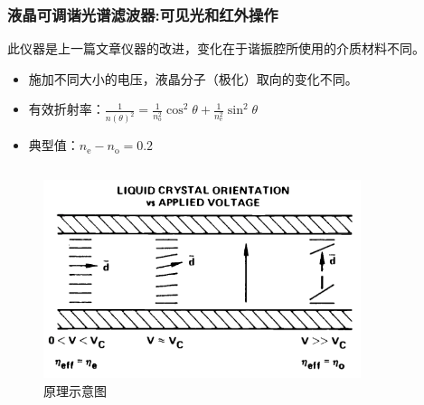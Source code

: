 \begin{frame}[c]
    \frametitle{液晶可调谐光谱滤波器:可见光和红外操作}
    此仪器是上一篇文章仪器的改进，变化在于谐振腔所使用的介质材料不同。
    \begin{itemize}
        \item 施加不同大小的电压，液晶分子（极化）取向的变化不同。
        \item 有效折射率：$\frac{1}{n(\theta)^2}=\frac{1}{n_\mathrm{o}^2}\cos^2\theta+\frac{1}{n_\mathrm{e}^2}\sin^2\theta$
        \item 典型值：$n_{\mathrm{e}}-n_{\mathrm{o}}=0.2$
    \end{itemize}

    \begin{columns}
        \begin{column}{.5\textwidth}
            \begin{figure}[!htb] %
                \centering %
                \includegraphics[width=1.\textwidth]{figures/A Liquid Crystal Tunable Spectral Filter Visible And Infrared Operation_2.png} %
                \caption{原理示意图} %
            \end{figure}
        \end{column}
        \begin{column}{.5\textwidth}
            \begin{figure}[!htb] %
                \centering %

\end{figure}
\end{column}
\end{columns}
\end{frame}

